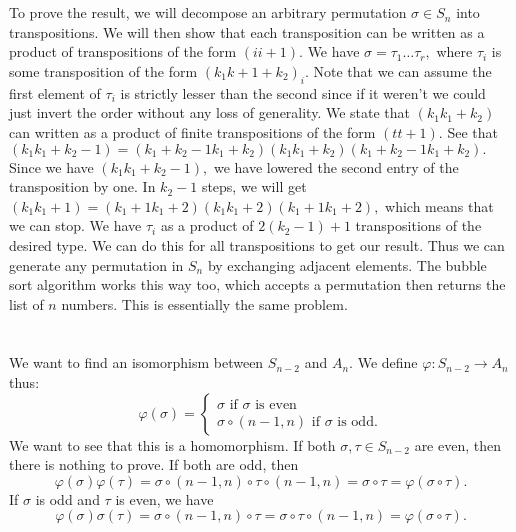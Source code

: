 \documentclass{article}
\title{} %
\author{Gandhar Kulkarni (mmat2304)} %
\date{} %
\begin{document}
\maketitle %


\section{} %
To prove the result, we will decompose an arbitrary permutation $\sigma \in S_n$ into transpositions. We will then show that each transposition can be 
written as a product of transpositions of the form $(i i+1).$ We have $\sigma=\tau_1\dots\tau_r,$ where $\tau_i$ is some transposition of the form $(k_1 
k+1+k_2)_i.$ Note that we can assume the first element of $\tau_i$ is strictly lesser than the second since if it weren't we could just invert the order 
without any loss of generality. We state that $(k_1 k_1+k_2)$ can written as a product of finite transpositions of the form $(t t+1).$ See that $(k_1 
k_1+k_2-1)=(k_1+k_2-1 k_1+k_2)(k_1 k_1+k_2)(k_1+k_2-1 k_1+k_2).$ Since we have $(k_1 k_1+k_2-1),$ we have lowered the second entry of the transposition by 
one. In $k_2-1$ steps, we will get $(k_1 k_1+1)=(k_1+1 k_1+2)(k_1 k_1+2)(k_1+1 k_1+2),$ which means that we can stop. We have $\tau_i$ as a product of 
$2(k_2-1)+1$ transpositions of the desired type. We can do this for all transpositions to get our result. Thus we can generate any permutation in $S_n$ by 
exchanging adjacent elements. 
The bubble sort algorithm works this way too, which accepts a permutation then returns the list of $n$ numbers. This is essentially the same problem.
\section{} %
We want to find an isomorphism between $S_{n-2}$ and $A_n.$ We define $\varphi:S_{n-2} \to A_n$ thus:
$$\varphi(\sigma)= \begin{cases}
	\sigma  \text{ if } \sigma \text{ is even}\\
	\sigma \circ (n-1,n)  \text{ if } \sigma \text{ is odd}.
\end{cases} $$
We want to see that this is a homomorphism. If both $\sigma, \tau \in S_{n-2}$
are even, then there is nothing to prove. If both are odd, then 
$$\varphi(\sigma)\varphi(\tau)= \sigma \circ (n-1,n) \circ \tau \circ (n-1,n)= \sigma \circ \tau = \varphi(\sigma \circ \tau). $$
If $\sigma$ is odd and $\tau$ is even, we have $$\varphi(\sigma) \sigma(\tau)= \sigma \circ (n-1, n) \circ \tau = \sigma \circ \tau \circ (n-1,n)= 
\varphi(\sigma \circ \tau).$$
\end{document}

